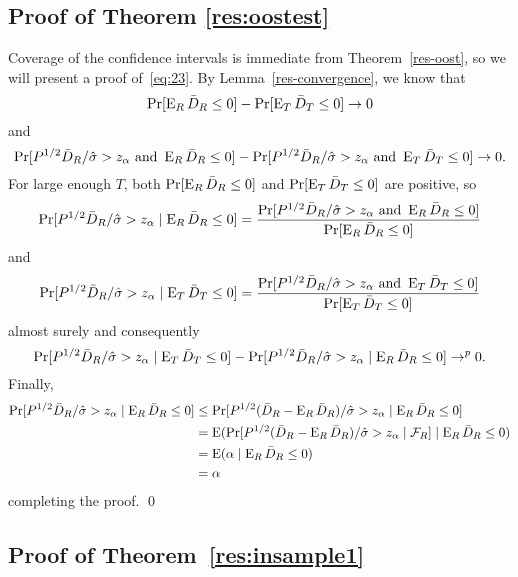 \documentclass[12pt]{article}
\begin{document}
\subsection*{Proof of Theorem \ref{res:oostest}}
Coverage of the confidence intervals is immediate from
Theorem~\ref{res-oost}, so we will present a proof of~\eqref{eq:23}.
By Lemma~\ref{res-convergence}, we know that
\begin{equation*}
  \Pr[\operatorname{E}_R \bar{D}_{R} \leq 0] - \Pr[\operatorname{E}_T \bar{D}_{T} \leq 0] \to 0
\end{equation*}
and
\begin{equation*}
  \Pr[P^{1/2} \bar{D}_{R} / \hat{\sigma} > z_\alpha \text{ and } \operatorname{E}_R \bar{D}_{R} \leq 0]
  - \Pr[P^{1/2} \bar{D}_{R} / \hat{\sigma} > z_\alpha \text{ and }
  \operatorname{E}_T \bar{D}_{T} \leq 0] \to 0.
\end{equation*}
For large enough $T$, both $\Pr[\operatorname{E}_R \bar{D}_{R} \leq 0]$ and $\Pr[\operatorname{E}_T
\bar{D}_{T} \leq 0]$ are positive, so
\begin{equation*}
  \Pr[P^{1/2} \bar{D}_{R} / \hat{\sigma} > z_\alpha
  \mid \operatorname{E}_R \bar{D}_{R} \leq 0] =
  \frac{\Pr[P^{1/2} \bar{D}_{R} / \hat{\sigma} > z_\alpha \text{ and }
    \operatorname{E}_R \bar{D}_{R} \leq 0]}{\Pr[\operatorname{E}_R \bar{D}_{R} \leq 0]}
\end{equation*}
and
\begin{equation*}
  \Pr[P^{1/2} \bar{D}_{R} / \hat{\sigma} > z_\alpha
  \mid \operatorname{E}_T \bar{D}_{T} \leq 0] =
  \frac{\Pr[P^{1/2} \bar{D}_{R} / \hat{\sigma} > z_\alpha \text{ and }
    \operatorname{E}_T \bar{D}_{T} \leq 0]}{\Pr[\operatorname{E}_T \bar{D}_{T} \leq 0]}
\end{equation*}
almost surely and consequently
\begin{equation*}
  \Pr[P^{1/2} \bar{D}_{R} / \hat{\sigma} > z_\alpha
  \mid \operatorname{E}_T \bar{D}_{T} \leq 0]
  - \Pr[P^{1/2} \bar{D}_{R} / \hat{\sigma} > z_\alpha
  \mid \operatorname{E}_R \bar{D}_{R} \leq 0] \to^p 0.
\end{equation*}
Finally,
\begin{align*}
  \Pr[P^{1/2} \bar{D}_{R} / \hat{\sigma} > z_\alpha \mid \operatorname{E}_R \bar{D}_{R} \leq 0]
  &\leq \Pr[P^{1/2} (\bar{D}_{R} - \operatorname{E}_R \bar{D}_{R}) / \hat{\sigma} > z_\alpha
  \mid \operatorname{E}_R \bar{D}_{R} \leq 0] \\
  &= \operatorname{E}( \Pr[P^{1/2} (\bar{D}_{R} - \operatorname{E}_R \bar{D}_{R}) / \hat{\sigma} > z_\alpha
  \mid \mathcal{F}_R] \mid \operatorname{E}_R \bar{D}_{R} \leq 0) \\
  &= \operatorname{E}(\alpha \mid \operatorname{E}_R \bar{D}_{R} \leq 0) \\
  &= \alpha
\end{align*}
completing the proof.
\qed

\subsection*{Proof of Theorem~\ref{res:insample1}}
\end{document}
